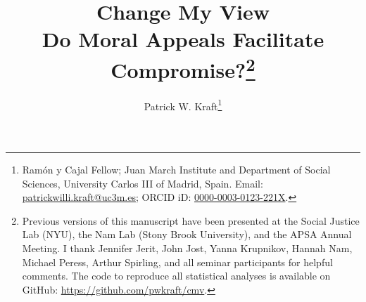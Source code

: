 \documentclass[12pt]{article}
\author{Patrick W. Kraft\footnote{Ramón y Cajal Fellow; Juan March Institute and Department of Social Sciences, University Carlos III of Madrid, Spain. Email: \href{mailto:patrickwilli.kraft@uc3m.es}{patrickwilli.kraft@uc3m.es}; ORCID iD: \href{https://orcid.org/0000-0003-0123-221X}{0000-0003-0123-221X}.}}
\title{Change My View\\
\large{Do Moral Appeals Facilitate Compromise?}\footnote{Previous versions of this manuscript have been presented at the Social Justice Lab (NYU), the Nam Lab (Stony Brook University), and the APSA Annual Meeting. I thank Jennifer Jerit, John Jost, Yanna Krupnikov, Hannah Nam, Michael Peress, Arthur Spirling, and all seminar participants for helpful comments. The code to reproduce all statistical analyses is available on GitHub: \url{https://github.com/pwkraft/cmv}.
}}
\date{}
\begin{document}
\maketitle
\doublespacing
\thispagestyle{empty}

\vfill
\begin{abstract}\singlespacing
\noindent 
\end{abstract}
\vfill

\newpage\setcounter{page}{1}


\singlespacing


\end{document}
